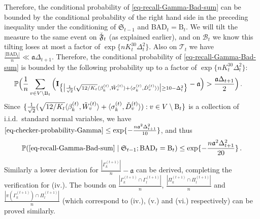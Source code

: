 \documentclass[11pt]{article}
\numberwithin{equation}{section}
\begin{document}
Therefore, the conditional probability of \eqref{eq-recall-Gamma-Bad-sum}  can be bounded by the conditional probability of the right hand side in the preceding inequality under the conditioning of $\mathfrak{S}_{t-1}$ and $\mathrm{BAD}_t = \mathrm{B}_t$. We will tilt the measure to the same event on $\Check{\mathfrak F}_t$ (as explained earlier), and on $\mathcal{B}_{t}$ we know this tilting loses at most a factor of $\exp \{ n K_t^{30} \Delta_t^2 \}$. Also on $\mathcal T_t$ we have $\frac{|\mathrm{BAD}_{t}|}{n} \ll \mathfrak{a} \Delta_{t+1}$. Therefore, the conditional probability of \eqref{eq-recall-Gamma-Bad-sum} is bounded by the following probability up to a factor of $\exp \{ n K_t^{30} \Delta_t^2 \}$:
\begin{align}
    & \mathbb{P} \Big( \frac{1}{n} \sum_{v \in V \setminus \mathrm{B}_{t}} \Big( \mathbf{I}_{ \big\{ \big| \frac{1}{\sqrt{2}} ( \sqrt{12/K_t} \langle \beta^{(t)}_k, \Tilde{W}^{(t)}_v \rangle + \langle \sigma^{(t)}_k, \Check{D}^{(t)}_v \rangle) \big| \geq 10 - \Delta_t^2 \big\} } - \mathfrak{a} \Big) > \frac{ \mathfrak{a} \Delta_{t+1}}{2} \Big) \,. \label{eq-checker-probability-Gamma}
\end{align}
Since $\{ \frac{1}{\sqrt{2}} ( \sqrt{12/K_t} \langle \beta^{(t)}_k, \Tilde{W}^{(t)}_v \rangle + \langle \sigma^{(t)}_k, \Check{D}^{(t)}_v \rangle ) : v \in V \setminus \mathrm{B}_{t} \}$ is a collection of i.i.d.\ standard normal variables, we have $\eqref{eq-checker-probability-Gamma} \leq  \exp \{ - \frac{ n \mathfrak{a}^2 \Delta_{t+1}^2 }{10}\}$, and thus 
\begin{align*}
    \mathbb P(\eqref{eq-recall-Gamma-Bad-sum} \mid \mathfrak{S}_{t-1};\mathrm{BAD}_t = \mathrm{B}_t) \leq  \exp \{ - \frac{ n \mathfrak{a}^2 \Delta_{t+1}^2 }{20} \} \,.
\end{align*}
Similarly a lower deviation for $\frac{|\Gamma^{(t+1)}_k|}{n}-\mathfrak{a}$ can be derived, completing the verification for (iv.). 
The bounds on $\frac{|\Gamma^{(t+1)}_k \cap \Gamma^{(t+1)}_l|}{n}$, $\frac{|\Pi^{(t+1)}_k \cap \Pi^{(t+1)}_l|}{n} $ and $ \frac{| \pi(\Gamma^{(t+1)}_k) \cap \Pi^{(t+1)}_l|}{n}$ (which correspond to (iv.), (v.) and (vi.) respectively) can be proved similarly.
\end{document}
